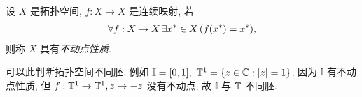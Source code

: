     \begin{Definition}[不动点性质]
        设 $ X $ 是拓扑空间, $ f: X\to X $ 是连续映射, 若
        \begin{align*}
            \forall f: X\to X\, \exists x^{*}\in X\,(f(x^{*})=x^{*}),
        \end{align*}
        则称 $ X $ 具有\emph{不动点性质}. 
    \end{Definition}
    可以此判断拓扑空间不同胚, 例如 $ \mathbb{I}=[0, 1],\ \mathbb{T}^{1}=\left\{ z\in\mathbb{C}: \left| z \right| =1 \right\} $, 因为 $ \mathbb{I} $ 有不动点性质, 但 $ f: \mathbb{T}^{1}\to \mathbb{T}^{1}, z\mapsto -z $ 没有不动点, 故 $ \mathbb{I} $ 与 $ \mathbb{T} $ 不同胚. 